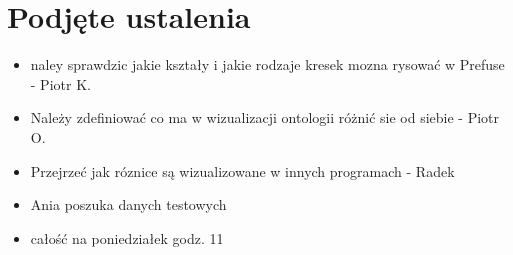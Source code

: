 \documentclass[a4paper,10pt]{article}
\begin{document}
\section{Podjęte ustalenia}
\begin{itemize}
 \item naley sprawdzic jakie kształy i jakie rodzaje kresek mozna rysować w Prefuse - Piotr K.
\item Należy zdefiniować co ma w wizualizacji ontologii różnić sie od siebie - Piotr O.
\item Przejrzeć jak róznice są wizualizowane w innych programach - Radek
\item Ania poszuka danych testowych	
 \item całość na poniedziałek godz. 11
\end{itemize}
\end{document}
